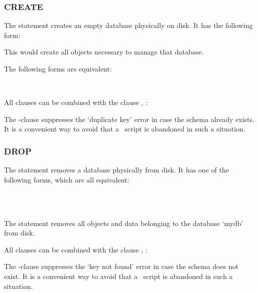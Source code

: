 \subsubsection{CREATE}
The  statement
creates an empty database physically on disk.
It has the following form:

 

This would create all objects necessary
to manage that database.

The following forms are equivalent:

 \\
 

All  clauses can be combined
with the clause , \eg:

  

The -clause
suppresses the `duplicate key' error
in case the schema
already exists.
It is a convenient way to avoid
that a \sql\ script is abandoned
in such a situation.

\subsubsection{DROP}
The  statement
removes a database physically from disk.
It has one of the following forms,
which are all equivalent:

 \\
 \\
 

The statement removes all objects and data
belonging to the database `mydb' from disk.

All  clauses can be combined
with the clause , \eg:

  

The -clause
suppresses the `key not found' error
in case the schema
does not exist.
It is a convenient way to avoid
that a \sql\ script is abandoned
in such a situation.



